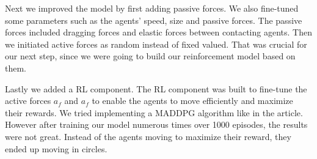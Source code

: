\documentclass[9pt]{pnas-new}
\begin{document}
	Next we improved the model by first adding passive forces. We also fine-tuned some parameters such as the agents' speed, size and passive forces. 
	The passive forces included dragging forces and elastic forces between contacting agents.
	Then we initiated active forces as random instead of fixed valued. That was crucial for our next step, since we were going to build our reinforcement model based on them.
	
	Lastly we added a RL component. The RL component was built to fine-tune the active forces $a_f$ and $a_f$ to enable the agents to move efficiently and maximize their rewards. We tried implementing a MADDPG algorithm like in the article. However after training our model numerous times over 1000 episodes, the results were not great. Instead of the agents moving to maximize their reward, they ended up moving in circles.
	
\end{document}

